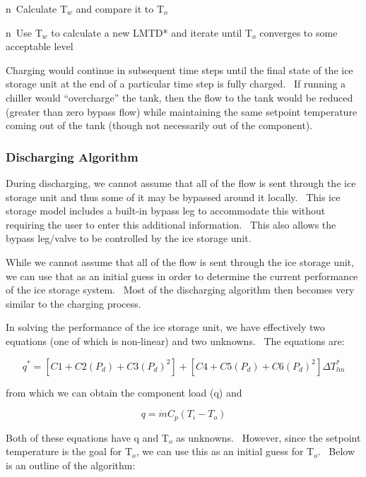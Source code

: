 n~Calculate T\(_{w}\) and compare it to T\(_{o}\)

n~Use T\(_{w}\) to calculate a new LMTD* and iterate until T\(_{o}\) converges to some acceptable level

Charging would continue in subsequent time steps until the final state of the ice storage unit at the end of a particular time step is fully charged.~ If running a chiller would ``overcharge'' the tank, then the flow to the tank would be reduced (greater than zero bypass flow) while maintaining the same setpoint temperature coming out of the tank (though not necessarily out of the component).

\subsubsection{Discharging Algorithm}\label{discharging-algorithm}

During discharging, we cannot assume that all of the flow is sent through the ice storage unit and thus some of it may be bypassed around it locally.~ This ice storage model includes a built-in bypass leg to accommodate this without requiring the user to enter this additional information.~ This also allows the bypass leg/valve to be controlled by the ice storage unit.

While we cannot assume that all of the flow is sent through the ice storage unit, we can use that as an initial guess in order to determine the current performance of the ice storage system.~ Most of the discharging algorithm then becomes very similar to the charging process.

In solving the performance of the ice storage unit, we have effectively two equations (one of which is non-linear) and two unknowns.~ The equations are:

\begin{equation}
{q^*} = \left[ {C1 + C2\left( {{P_d}} \right) + C3{{\left( {{P_d}} \right)}^2}} \right] + \left[ {C4 + C5\left( {{P_d}} \right) + C6{{\left( {{P_d}} \right)}^2}} \right]\Delta T_{lm}^*
\end{equation}

from which we can obtain the component load (q) and

\begin{equation}
q = \dot m{C_p}\left( {{T_i} - {T_o}} \right)
\end{equation}

Both of these equations have q and T\(_{o}\) as unknowns.~ However, since the setpoint temperature is the goal for T\(_{o}\), we can use this as an initial guess for T\(_{o}\).~ Below is an outline of the algorithm:

